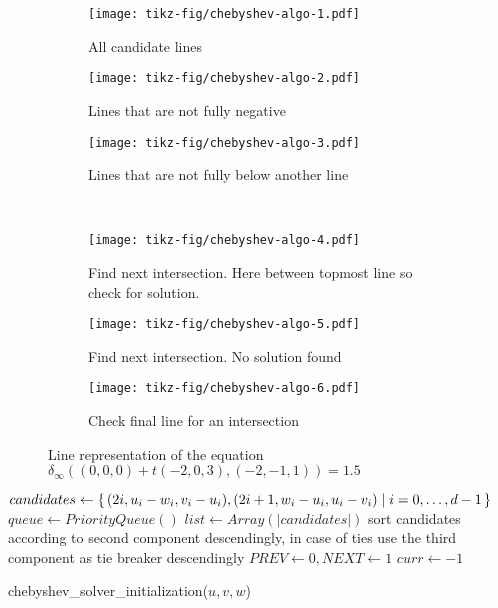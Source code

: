 \begin{figure}
  \centering 
  \begin{subfigure}[ht]{0.3\textwidth}
    \texttt{[image: tikz-fig/chebyshev-algo-1.pdf]}
    \caption{All candidate lines}
  \end{subfigure}
  \begin{subfigure}[ht]{0.3\textwidth}
    \texttt{[image: tikz-fig/chebyshev-algo-2.pdf]}
    \caption{Lines that are not fully negative}
  \end{subfigure}
  \begin{subfigure}[ht]{0.3\textwidth}
    \texttt{[image: tikz-fig/chebyshev-algo-3.pdf]}
    \caption{Lines that are not fully below another line}
  \end{subfigure}\\
  \begin{subfigure}[ht]{0.3\textwidth}
    \texttt{[image: tikz-fig/chebyshev-algo-4.pdf]}
    \caption{Find next intersection. Here between topmost line so check for solution.}
  \end{subfigure}
  \begin{subfigure}[ht]{0.3\textwidth}
    \texttt{[image: tikz-fig/chebyshev-algo-5.pdf]}
    \caption{Find next intersection. No solution found}
  \end{subfigure}
  \begin{subfigure}[ht]{0.3\textwidth}
    \texttt{[image: tikz-fig/chebyshev-algo-6.pdf]}
    \caption{Check final line for an intersection}
  \end{subfigure}
  \caption{Line representation of the equation \(\delta_\infty((0,0,0) + t(-2,0,3), (-2,-1,1)) = 1.5\)}
  \label{fig:chebyshev_algo}
\end{figure}

\begin{algorithm}[ht]
  \DontPrintSemicolon
  \BlankLine
  \(candidates \gets \set{(2i, u_i - w_i, v_i - u_i), (2i+1, w_i - u_i, u_i - v_i) | i = 0, \dots, d - 1}\) \;
  \(queue \gets PriorityQueue()\) \;
  \(list \gets Array(|candidates|)\) \;
  sort candidates according to second component descendingly,
  in case of ties use the third component as tie breaker descendingly \;
  \(PREV \gets 0, NEXT \gets 1\) 
  \(curr \gets -1\) \;

  \caption{chebyshev\_solver\_initialization(\(u, v, w\))}
  \label{algo:solve_chebyshev_init}
\end{algorithm}

